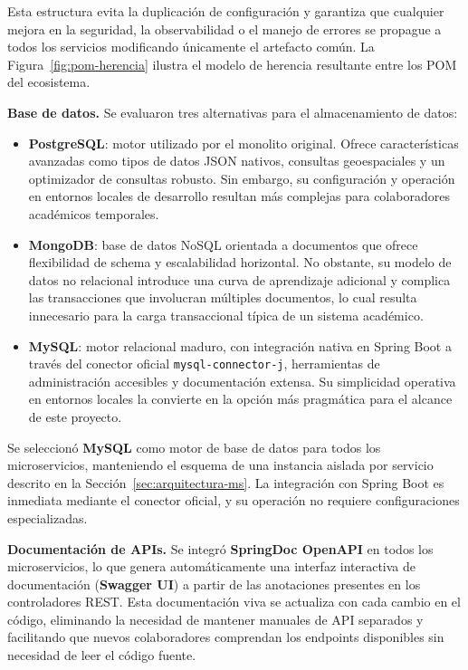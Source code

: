 Esta estructura evita la duplicación de configuración y garantiza que cualquier
mejora en la seguridad, la observabilidad o el manejo de errores se propague a todos
los servicios modificando únicamente el artefacto común. La Figura~\ref{fig:pom-herencia}
ilustra el modelo de herencia resultante entre los POM del ecosistema.

\textbf{Base de datos.} Se evaluaron tres alternativas para el almacenamiento de datos:

\begin{itemize}
    \item \textbf{PostgreSQL}: motor utilizado por el monolito original. Ofrece
    características avanzadas como tipos de datos JSON nativos, consultas
    geoespaciales y un optimizador de consultas robusto. Sin embargo, su
    configuración y operación en entornos locales de desarrollo resultan más
    complejas para colaboradores académicos temporales.
    \item \textbf{MongoDB}: base de datos NoSQL orientada a documentos que ofrece
    flexibilidad de schema y escalabilidad horizontal. No obstante, su modelo de
    datos no relacional introduce una curva de aprendizaje adicional y complica
    las transacciones que involucran múltiples documentos, lo cual resulta
    innecesario para la carga transaccional típica de un sistema académico.
    \item \textbf{MySQL}: motor relacional maduro, con integración nativa en Spring
    Boot a través del conector oficial \texttt{mysql-connector-j}, herramientas de
    administración accesibles y documentación extensa. Su simplicidad operativa en
    entornos locales la convierte en la opción más pragmática para el alcance de
    este proyecto.
\end{itemize}

Se seleccionó \textbf{MySQL} como motor de base de datos para todos los
microservicios, manteniendo el esquema de una instancia aislada por servicio
descrito en la Sección~\ref{sec:arquitectura-ms}. La integración con Spring Boot es inmediata mediante
el conector oficial, y su operación no requiere configuraciones especializadas.

\textbf{Documentación de APIs.} Se integró \textbf{SpringDoc OpenAPI} en todos los
microservicios, lo que genera automáticamente una interfaz interactiva de documentación
(\textbf{Swagger UI}) a partir de las anotaciones presentes en los controladores REST.
Esta documentación viva se actualiza con cada cambio en el código, eliminando la
necesidad de mantener manuales de API separados y facilitando que nuevos colaboradores
comprendan los endpoints disponibles sin necesidad de leer el código fuente.

